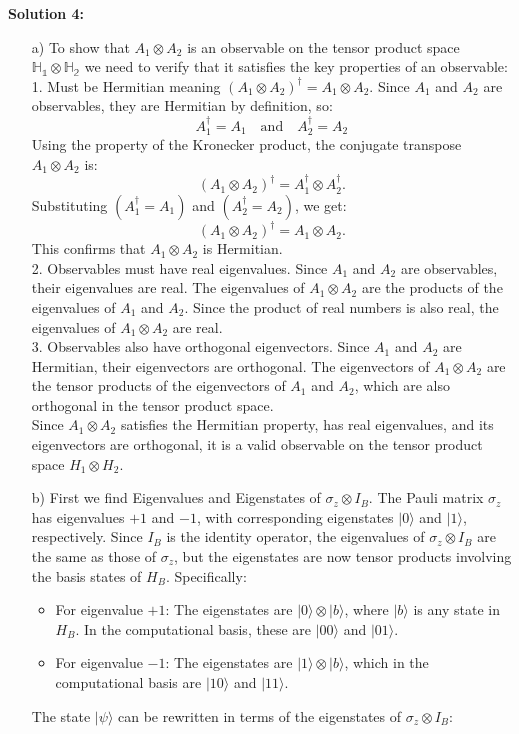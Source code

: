 \documentclass{article}
\begin{document}
\textbf{Solution 4:}
\begin{enumerate}
    \item[a)] To show that $A_1 \otimes A_2$ is an observable on the tensor product space $\mathbb{H_1}\otimes\mathbb{H_2}$ we need to verify that it satisfies the key properties of an observable:\\
    1. Must be Hermitian meaning $(A_1 \otimes A_2)^\dagger=A_1 \otimes A_2$. Since $A_1$ and $A_2$ are observables, they are Hermitian by definition, so: $$A_1^\dagger = A_1 \quad \text{and} \quad A_2^\dagger = A_2$$ Using the property of the Kronecker product, the conjugate transpose $A_1 \otimes A_2$ is:
    $$(A_1 \otimes A_2)^\dagger = A_1^\dagger \otimes A_2^\dagger.$$
    Substituting $( A_1^\dagger = A_1)$ and $(A_2^\dagger = A_2)$, we get: $$(A_1 \otimes A_2)^\dagger = A_1 \otimes A_2.$$
    This confirms that $A_1 \otimes A_2$ is Hermitian.\\
    
    2. Observables must have real eigenvalues. Since \( A_1 \) and \( A_2 \) are observables, their eigenvalues are real. The eigenvalues of \( A_1 \otimes A_2 \) are the products of the eigenvalues of \( A_1 \) and \( A_2 \). Since the product of real numbers is also real, the eigenvalues of \( A_1 \otimes A_2 \) are real.\\
    
    3. Observables also have orthogonal eigenvectors. Since \( A_1 \) and \( A_2 \) are Hermitian, their eigenvectors are orthogonal. The eigenvectors of \( A_1 \otimes A_2 \) are the tensor products of the eigenvectors of \( A_1 \) and \( A_2 \), which are also orthogonal in the tensor product space.\\
    
    Since \( A_1 \otimes A_2 \) satisfies the Hermitian property, has real eigenvalues, and its eigenvectors are orthogonal, it is a valid observable on the tensor product space \( H_1 \otimes H_2 \).
    \item[b)] First we find Eigenvalues and Eigenstates of $\sigma_z \otimes I_B$.
    The Pauli matrix \( \sigma_z \) has eigenvalues \( +1 \) and \( -1 \), with corresponding eigenstates \( |0\rangle \) and \( |1\rangle \), respectively. Since \( I_B \) is the identity operator, the eigenvalues of \( \sigma_z \otimes I_B \) are the same as those of \( \sigma_z \), but the eigenstates are now tensor products involving the basis states of \( H_B \). Specifically:

    \begin{itemize}
        \item For eigenvalue \( +1 \): The eigenstates are \( |0\rangle \otimes |b\rangle \), where \( |b\rangle \) is any state in \( H_B \). In the computational basis, these are \( |00\rangle \) and \( |01\rangle \).
        \item For eigenvalue \( -1 \): The eigenstates are \( |1\rangle \otimes |b\rangle \), which in the computational basis are \( |10\rangle \) and \( |11\rangle \).
    \end{itemize}
    The state $ |\psi\rangle $ can be rewritten in terms of the eigenstates of $ \sigma_z \otimes I_B $:


\end{enumerate}
\end{document}
